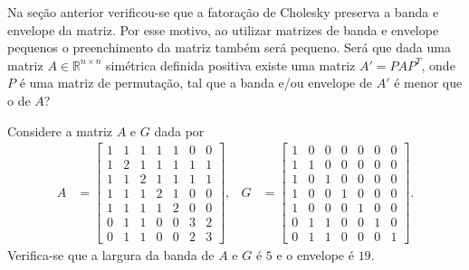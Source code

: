 Na seção anterior verificou-se que a fatoração de Cholesky preserva a banda e
envelope da matriz. Por esse motivo, ao utilizar matrizes de banda e
envelope pequenos o preenchimento da matriz também será pequeno. Será que dada
uma matriz $A \in \mathbb{R}^{n \times n}$ simétrica definida positiva existe
uma matriz $A' = P A P^T$, onde $P$ é uma matriz de permutação, tal que a banda
e/ou envelope de $A'$ é menor que o de $A$?

\begin{exem}
    Considere a matriz $A$ e $G$ dada por
    \begin{align*}
        A &= \begin{bmatrix}
            1 & 1 & 1 & 1 & 1 & 0 & 0 \\
            1 & 2 & 1 & 1 & 1 & 1 & 1 \\
            1 & 1 & 2 & 1 & 1 & 1 & 1 \\
            1 & 1 & 1 & 2 & 1 & 0 & 0 \\
            1 & 1 & 1 & 1 & 2 & 0 & 0 \\
            0 & 1 & 1 & 0 & 0 & 3 & 2 \\
            0 & 1 & 1 & 0 & 0 & 2 & 3
        \end{bmatrix},
        & G &= \begin{bmatrix}
            1 & 0 & 0 & 0 & 0 & 0 & 0 \\
            1 & 1 & 0 & 0 & 0 & 0 & 0 \\
            1 & 0 & 1 & 0 & 0 & 0 & 0 \\
            1 & 0 & 0 & 1 & 0 & 0 & 0 \\
            1 & 0 & 0 & 0 & 1 & 0 & 0 \\
            0 & 1 & 1 & 0 & 0 & 1 & 0 \\
            0 & 1 & 1 & 0 & 0 & 0 & 1
        \end{bmatrix}.
    \end{align*}
    Verifica-se que a largura da banda de $A$ e $G$ é $5$ e o envelope é $19$.


\end{exem}
